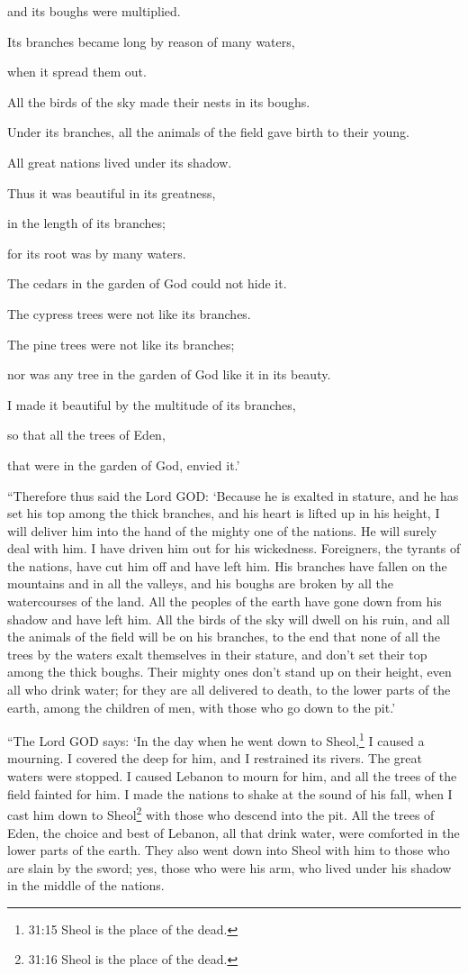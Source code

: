 and its boughs were multiplied.

Its branches became long by reason of many waters,

when it spread them out.

\myverse{}All the birds of the sky made their nests in its boughs.

Under its branches, all the animals of the field gave birth to their young.

All great nations lived under its shadow.

\myverse{}Thus it was beautiful in its greatness,

in the length of its branches;

for its root was by many waters.

\myverse{}The cedars in the garden of God could not hide it.

The cypress trees were not like its branches.

The pine trees were not like its branches;

nor was any tree in the garden of God like it in its beauty.

\myverse{}I made it beautiful by the multitude of its branches,

so that all the trees of Eden,

that were in the garden of God, envied it.’

\myverse{}“Therefore thus said the Lord GOD: ‘Because he is exalted in
stature, and he has set his top among the thick branches, and his heart is lifted up in his height,
\myverse{}I will deliver him into the hand of the mighty one of the nations. He will
surely deal with him. I have driven him out for his wickedness.
\myverse{}Foreigners, the tyrants of the nations, have cut him off and have left him.
His branches have fallen on the mountains and in all the valleys, and his boughs are broken by all the
watercourses of the land. All the peoples of the earth have gone down from his shadow and have left him.
\myverse{}All the birds of the sky will dwell on his ruin, and all the animals of the
field will be on his branches,
\myverse{}to the end that none of all the trees by the waters exalt themselves in their
stature, and don’t set their top among the thick boughs. Their mighty ones don’t stand up on their height,
even all who drink water; for they are all delivered to death, to the lower parts of the earth, among
the children of men, with those who go down to the pit.’

\myverse{}“The Lord GOD says: ‘In the day when he went down to Sheol,\footnote{31:15 Sheol is the place of the dead.} I caused a mourning. I covered the deep for him, and
I restrained its rivers. The great waters were stopped. I caused Lebanon to mourn for him, and all the
trees of the field fainted for him.
\myverse{}I made the nations to shake at the sound of his fall, when I cast him down
to Sheol\footnote{31:16 Sheol is the place of the dead.} with those who descend into the pit. All the trees of
Eden, the choice and best of Lebanon, all that drink water, were comforted in the lower parts of the earth.
\myverse{}They also went down into Sheol with him to those who are slain by the sword;
yes, those who were his arm, who lived under his shadow in the middle of the nations.


